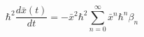 \begin{equation}%
\hbar^2 \frac{d\bar{x} (t)}{dt} = - \bar{x}^2 \hbar^2 \sum_{n=0}^\infty \bar{x}^n \hbar^n \beta_n
\end{equation}

